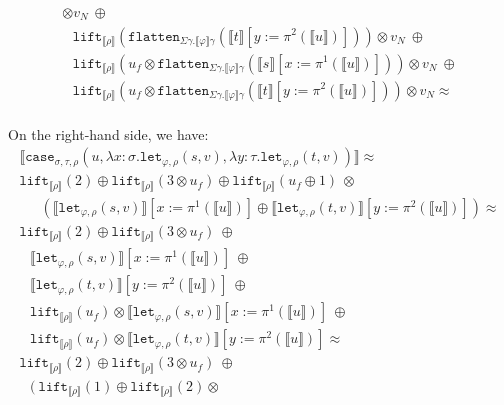 \documentclass[a4paper,UKenglish,cleveref,autoref,numberwithinsect]{lipics-v2019}
\theoremstyle{definition}
\newcommand{\abs}[2]{\lambda #1.#2}
\newcommand{\flatten}{\mathtt{flatten}}
\newcommand{\lift}{\mathtt{lift}}
\newcommand{\typeinterpret}[1]{\llbracket #1 \rrbracket}
\newcommand{\interpret}[1]{\llbracket #1 \rrbracket}
\begin{document}
\begin{itemize}
\[\begin{array}{l}
    \otimes v_N\ \oplus \\
  \phantom{A}
  \lift_{\typeinterpret{\rho}}(\flatten_{\Sigma\gamma.\typeinterpret{
    \varphi}\gamma}(\interpret{t}[y:=\pi^2(\interpret{u})]))
    \otimes v_N\ \oplus \\
  \phantom{A}
  \lift_{\typeinterpret{\rho}}(u_f \otimes
    \flatten_{\Sigma\gamma.\typeinterpret{\varphi}\gamma}(
    \interpret{s}[x:=\pi^1(\interpret{u})]))
    \otimes v_N\ \oplus \\
  \phantom{A} \lift_{\typeinterpret{\rho}}(u_f \otimes
    \flatten_{\Sigma\gamma.\typeinterpret{
    \varphi}\gamma}(\interpret{t}[y:=\pi^2(\interpret{u})])) \otimes
    v_N \approx \\
  \end{array}
  \]

  On the right-hand side, we have:
  \[
  \begin{array}{l}
  \interpret{\mathtt{case}_{\sigma,\tau,\rho}(u,
  \abs{x:\sigma}{\mathtt{let}_{\varphi,\rho}(s,v)},
  \abs{y:\tau}{\mathtt{let}_{\varphi,\rho}(t,v)})} \approx \\
  \lift_{\typeinterpret{\rho}}(2) \oplus
  \lift_{\typeinterpret{\rho}}(3 \otimes u_f) \oplus
  \lift_{\typeinterpret{\rho}}(u_f \oplus 1)\ \otimes \\
  \phantom{AB}
    (\interpret{\mathtt{let}_{\varphi,\rho}(s,v)}[x:=\pi^1(
    \interpret{u})] \oplus
    \interpret{\mathtt{let}_{\varphi,\rho}(t,v)}[y:=\pi^2(
    \interpret{u})]) \approx \\
  \lift_{\typeinterpret{\rho}}(2) \oplus
  \lift_{\typeinterpret{\rho}}(3 \otimes u_f)\ \oplus \\
  \phantom{A}
  \interpret{\mathtt{let}_{\varphi,\rho}(s,v)}[x:=\pi^1(
    \interpret{u})]\ \oplus \\
  \phantom{A}
    \interpret{\mathtt{let}_{\varphi,\rho}(t,v)}[y:=\pi^2(
    \interpret{u})]\ \oplus \\
  \phantom{A}
  \lift_{\typeinterpret{\rho}}(u_f) \otimes
    \interpret{\mathtt{let}_{\varphi,\rho}(s,v)}[x:=\pi^1(
    \interpret{u})]\ \oplus \\
  \phantom{A}
  \lift_{\typeinterpret{\rho}}(u_f) \otimes
    \interpret{\mathtt{let}_{\varphi,\rho}(t,v)}[y:=\pi^2(
    \interpret{u})] \approx \\
  \lift_{\typeinterpret{\rho}}(2) \oplus
  \lift_{\typeinterpret{\rho}}(3 \otimes u_f)\ \oplus \\
  \phantom{A}
  (\ \lift_{\typeinterpret{\rho}}(1) \oplus
    \lift_{\typeinterpret{\rho}}(2) \otimes

\end{array}\]
\end{itemize}
\end{document}
